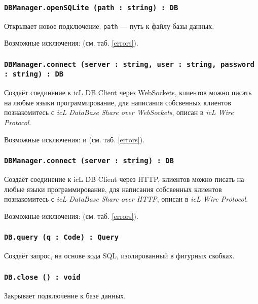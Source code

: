 \subsubsection{\texttt{DBManager.openSQLite (path : string) : DB}}

Открывает новое подключение. \texttt{path} — путь к файлу базы данных.

Возможные исключения:  (см. таб. \ref{errors}).

\subsubsection{\texttt{DBManager.connect (server : string, user : string, password : string) : DB}}

Создаёт соединение к icL DB Client через WebSockets, клиентов можно писать на любые языки программирование, для написания собсвенных клиентов познакомитесь с \textit{icL DataBase Share over WebSockets}, описан в \textit{icL Wire Protocol}.

Возможные исключения:  и  (см. таб. \ref{errors}).

\subsubsection{\texttt{DBManager.connect (server : string) : DB}}

Создаёт соединение к icL DB Client через HTTP, клиентов можно писать на любые языки программирование, для написания собсвенных клиентов познакомитесь с \textit{icL DataBase Share over HTTP}, описан в \textit{icL Wire Protocol}.

Возможные исключения:  (см. таб. \ref{errors}).

\subsubsection{\texttt{DB.query (q : Code) : Query}}

Создаёт запрос, на основе кода SQL, изолированный в фигурных скобках.

\subsubsection{\texttt{DB.close () : void}}

Закрывает подключение к базе данных.

